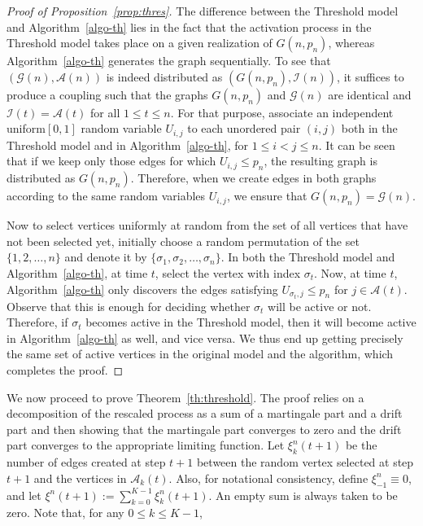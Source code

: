 \documentclass[11pt,a4paper, reqno]{article}
\begin{document}
\begin{proof}[Proof of Proposition~\ref{prop:thres}]
The difference between the Threshold model and Algorithm~\ref{algo-th} lies in the fact that the activation process in the Threshold model takes place on a given realization  of $G(n,p_n)$, whereas Algorithm~\ref{algo-th} generates the graph sequentially. To see that $(\mathcal{G}(n),\mathcal{A}(n))$ is indeed distributed as $(G(n,p_n),\mathcal{I}(n))$, it suffices to produce a coupling such that the graphs $G(n,p_n)$ and $\mathcal{G}(n)$ are identical and $\mathcal{I}(t)=\mathcal{A}(t)$ for all $1\leq t\leq n$.
For that purpose, associate an independent uniform$[0,1]$ random variable $U_{i,j}$ to each unordered pair $(i,j)$ both in the Threshold model and in Algorithm~\ref{algo-th}, for $1\leq i<j\leq n$. It can be seen that if we keep only those edges for which $U_{i,j}\leq p_n$, the resulting graph is distributed as $G(n,p_n)$. Therefore, when we create edges in both graphs according to the same random variables $U_{i,j}$, we ensure that $G(n,p_n)=\mathcal{G}(n).$

Now to select vertices uniformly at random from the set of all vertices that have not been selected yet, initially choose a random permutation of the set $\{1,2,\ldots, n\}$ and denote it by $\{\sigma_1,\sigma_2,\ldots,\sigma_n\}$. In both the Threshold model and Algorithm~\ref{algo-th}, at time $t$, select the vertex with index $\sigma_t$. Now, at time $t$, Algorithm~\ref{algo-th} only discovers the edges satisfying $U_{\sigma_t,j}\leq p_n$ for $j\in \mathcal{A}(t)$. Observe that this is enough for deciding whether $\sigma_t$ will be active or not. Therefore, if $\sigma_t$ becomes active in the Threshold model, then it will become active in Algorithm~\ref{algo-th} as well, and vice versa. We thus end up  getting precisely the same set of active vertices in the original model and the algorithm, which completes the proof.
\end{proof}
We now proceed to prove Theorem~\ref{th:threshold}. The proof relies on a decomposition of the rescaled process as a sum of a martingale part and a drift part and then showing that the martingale part converges to zero and the drift part converges to the appropriate limiting function.
 Let $\xi_k^n(t+1)$ be the number of edges created at step $t+1$ between the random vertex selected at step $t+1$  and the vertices in $\mathcal{A}_k(t)$. Also, for notational consistency, define $\xi_{-1}^n\equiv 0 $, and let $\xi^n(t+1):=\sum_{k=0}^{K-1}\xi_k^n(t+1)$. An empty sum is always taken to be zero. Note that, for any $0\leq k\leq K-1$,
\end{document}
